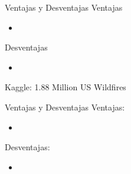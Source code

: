 \begin{frame}{Ventajas y Desventajas}
    Ventajas
    \begin{itemize}
        \item 
    \end{itemize}
    
    Desventajas
    \begin{itemize}
        \item 
    \end{itemize}
\end{frame}

\begin{frame}{Kaggle: 1.88 Million US Wildfires}
    
\end{frame}

\begin{frame}{Ventajas y Desventajas}
    Ventajas:
    \begin{itemize}
        \item 
    \end{itemize}
    
    Desventajas:
    \begin{itemize}
        \item 
    \end{itemize}
\end{frame}
